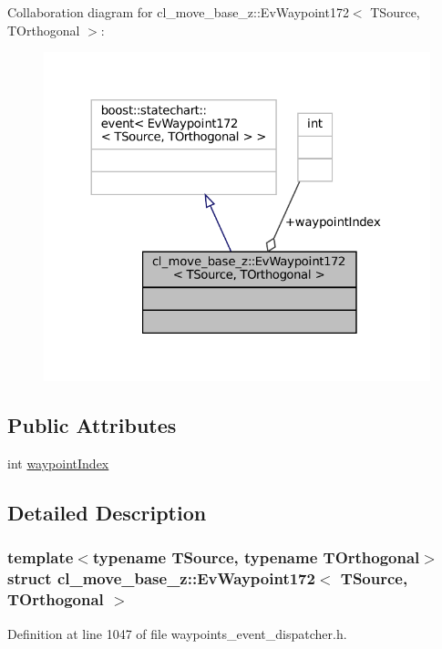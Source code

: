 Collaboration diagram for cl\+\_\+move\+\_\+base\+\_\+z\+:\+:Ev\+Waypoint172$<$ T\+Source, T\+Orthogonal $>$\+:
\nopagebreak
\begin{figure}[H]
\begin{center}
\leavevmode
\includegraphics[width=324pt]{structcl__move__base__z_1_1EvWaypoint172__coll__graph}
\end{center}
\end{figure}
\subsection*{Public Attributes}
\begin{DoxyCompactItemize}
\item 
int \hyperlink{structcl__move__base__z_1_1EvWaypoint172_aca7ef0f5681f2566d86e4398b928a6e5}{waypoint\+Index}
\end{DoxyCompactItemize}


\subsection{Detailed Description}
\subsubsection*{template$<$typename T\+Source, typename T\+Orthogonal$>$\newline
struct cl\+\_\+move\+\_\+base\+\_\+z\+::\+Ev\+Waypoint172$<$ T\+Source, T\+Orthogonal $>$}



Definition at line 1047 of file waypoints\+\_\+event\+\_\+dispatcher.\+h.



